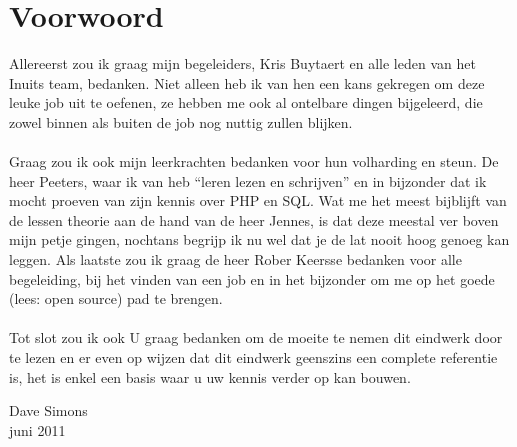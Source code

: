 \chapter*{Voorwoord}

Allereerst zou ik graag mijn begeleiders, Kris Buytaert en alle leden van het Inuits team, bedanken. Niet alleen heb ik van hen een kans gekregen om deze leuke job uit te oefenen, ze hebben me ook al ontelbare dingen bijgeleerd, die zowel binnen als buiten de job nog nuttig zullen blijken.\\\\
Graag zou ik ook mijn leerkrachten bedanken voor hun volharding en steun. De heer Peeters, waar ik van heb ``leren lezen en schrijven'' en in bijzonder dat ik mocht proeven van zijn kennis over PHP en SQL. Wat me het meest bijblijft van de lessen theorie aan de hand van de heer Jennes, is dat deze meestal ver boven mijn petje gingen, nochtans begrijp ik nu wel dat je de lat nooit hoog genoeg kan leggen. Als laatste zou ik graag de heer Rober Keersse bedanken voor alle begeleiding, bij het vinden van een job en in het bijzonder om me op het goede (lees: open source) pad te brengen.\\\\
Tot slot zou ik ook U graag bedanken om de moeite te nemen dit eindwerk door te lezen en er even op wijzen dat dit eindwerk geenszins een complete referentie is, het is enkel een basis waar u uw kennis verder op kan bouwen.\\

\begin{flushright}Dave Simons\\juni 2011\end{flushright}
